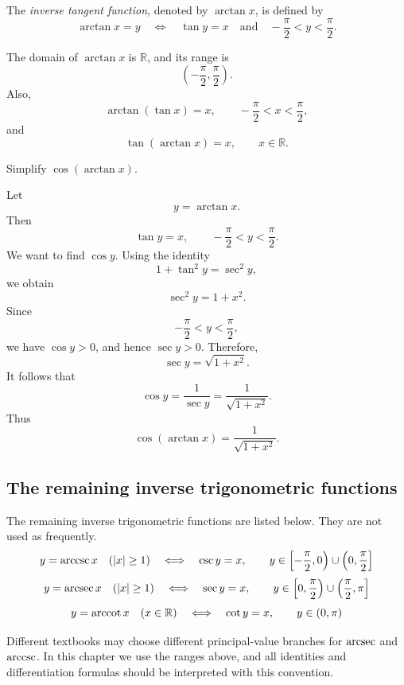 \begin{definition}
The \emph{inverse tangent function}, denoted by \(\arctan x\), is defined by
\[
\arctan x=y
\quad \Longleftrightarrow \quad
\tan y=x
\quad \text{and} \quad
-\frac{\pi}{2}<y<\frac{\pi}{2}.
\]
\end{definition}

\begin{remark}
The domain of \(\arctan x\) is \(\mathbb{R}\), and its range is
\[
\left(-\frac{\pi}{2},\frac{\pi}{2}\right).
\]
Also,
\[
\arctan(\tan x)=x,
\qquad -\frac{\pi}{2}<x<\frac{\pi}{2},
\]
and
\[
\tan(\arctan x)=x,
\qquad x\in\mathbb{R}.
\]
\end{remark}

\begin{example}
Simplify \(\cos(\arctan x)\).
\end{example}

\begin{solution}
Let
\[
y=\arctan x.
\]
Then
\[
\tan y=x,
\qquad
-\frac{\pi}{2}<y<\frac{\pi}{2}.
\]
We want to find \(\cos y\). Using the identity
\[
1+\tan^{2}y=\sec^{2}y,
\]
we obtain
\[
\sec^{2}y=1+x^{2}.
\]
Since
\[
-\frac{\pi}{2}<y<\frac{\pi}{2},
\]
we have \(\cos y>0\), and hence \(\sec y>0\). Therefore,
\[
\sec y=\sqrt{1+x^{2}}.
\]
It follows that
\[
\cos y=\frac{1}{\sec y}=\frac{1}{\sqrt{1+x^{2}}}.
\]
Thus
\[
\cos(\arctan x)=\frac{1}{\sqrt{1+x^{2}}}.
\]
\end{solution}

\subsection{The remaining inverse trigonometric functions}

The remaining inverse trigonometric functions are listed below. They are not used as frequently.
\[
y=\arccsc x \quad (|x|\ge 1)
\quad \Longleftrightarrow \quad
\csc y=x,
\qquad
y\in \left[-\frac{\pi}{2},0\right)\cup\left(0,\frac{\pi}{2}\right]
\]
\[
y=\arcsec x \quad (|x|\ge 1)
\quad \Longleftrightarrow \quad
\sec y=x,
\qquad
y\in \left[0,\frac{\pi}{2}\right)\cup\left(\frac{\pi}{2},\pi\right]
\]
\[
y=\arccot x \quad (x\in\mathbb{R})
\quad \Longleftrightarrow \quad
\cot y=x,
\qquad
y\in (0,\pi)
\]

\begin{remark}
Different textbooks may choose different principal-value branches for \(\arcsec\) and \(\arccsc\). In this chapter we use the ranges above, and all identities and differentiation formulas should be interpreted with this convention.
\end{remark}

